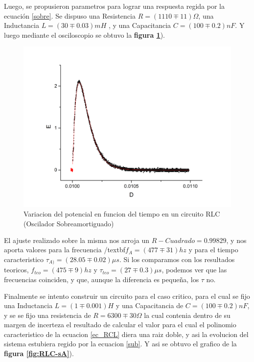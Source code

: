 \documentclass[11pt,a4paper]{article}
\begin{document}
Luego, se propusieron parametros para lograr una respuesta regida por la ecuación \eqref{sobre}. Se dispuso una Resistencia $R= (1110 \mp 11)\Omega$, una Inductancia $L = (30 \mp 0.03) mH$ , y una Capacitancia $C = (100 \mp 0.2) nF$. Y luego mediante el osciloscopio se obtuvo la \textbf{figura \ref{fig:RLC-SA}}).

\begin{figure}[H]
\centering
\includegraphics[scale=0.45]{RLC-SobreAmortiguado}
  \caption{Variacion del potencial en funcion del tiempo en un circuito RLC (Oscilador Sobreamortiguado)}
  \label{fig:RLC-SA}
\end{figure}

El ajuste realizado sobre la misma nos arroja un $R-Cuadrado = 0.99829$, y nos aporta valores para la frecuencia /textbf{$f_{A} = (477 \mp 31) hz$} y para el tiempo caracteristico \textbf{$\tau_{A)} = (28.05 \mp 0.02) \mu s$}. Si los comparamos con los resultados teoricos, \textbf{$f_{teo} = (475 \mp 9) hz$} y \textbf{$\tau_{teo} = (27 \mp 0.3) \mu s$}, podemos ver que las frecuencias coinciden, y que, aunque la diferencia es pequeña, los $\tau$ no.

Finalmente se intento construir un circuito para el caso critico, para el cual se fijo una Inductancia $L= (1 \mp 0.001) H$ y una Capacitancia de  $C = (100 \mp 0.2) nF$, y se se fijo una resistencia de $R = 6300 \mp 30 \Omega$  la cual contenia dentro de su margen de incerteza el resultado de calcular el valor para el cual el polinomio caracteristico de la ecuacion \eqref{ec_RCL} diera una raiz doble, y asi la evolucion del sistema estubiera regido por la ecuacion \eqref{sub}. Y asi se obtuvo el grafico de la \textbf{figura \ref{fig:RLC-sA}}).
\end{document}
